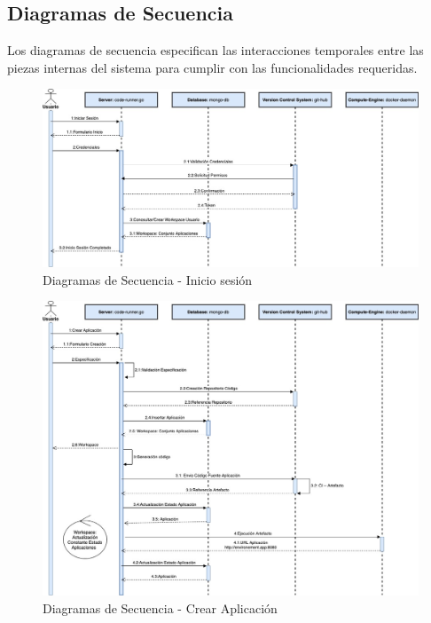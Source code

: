 \documentclass[a4paper,11pt]{book}
\begin{document}
\subsection{Diagramas de Secuencia}
Los diagramas de secuencia especifican las interacciones temporales entre las piezas internas del sistema para cumplir con las funcionalidades requeridas.


\begin{figure}[H]
\centering
\includegraphics[scale=0.45]{imagenes/secuencia1.jpg}
\caption{ Diagramas de Secuencia - Inicio sesión \cite{diagrama}  }
\end{figure}

\begin{figure}[H]
\centering
\includegraphics[scale=0.43]{imagenes/secuencia2.jpg}
\caption{ Diagramas de Secuencia - Crear Aplicación\cite{diagrama}  }
\end{figure}
\end{document}

